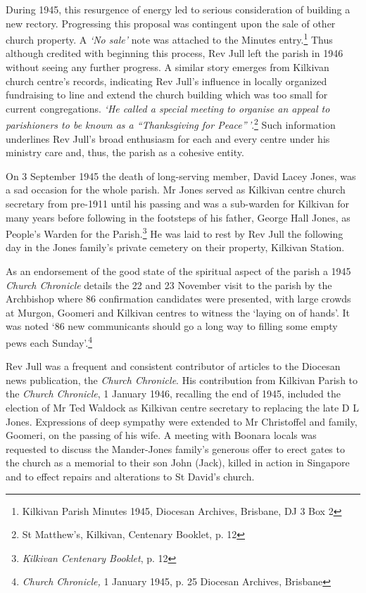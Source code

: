 During 1945, this resurgence of energy led to serious consideration of building a new rectory. Progressing this proposal was contingent upon the sale of other church property. A \emph{`No sale'} note was attached to the Minutes entry.\footnote{Kilkivan Parish Minutes 1945, Diocesan Archives, Brisbane, DJ 3 Box 2} Thus although credited with beginning this process, Rev Jull left the parish in 1946 without seeing any further progress. A similar story emerges from Kilkivan church centre's records, indicating Rev Jull's influence in locally organized fundraising to line and extend the church building which was too small for current congregations. \emph{`He called a special meeting to organise an appeal to parishioners to be known as a ``Thanksgiving for Peace''\,'}.\footnote{St Matthew's, Kilkivan, Centenary Booklet, p. 12} Such information underlines Rev Jull's broad enthusiasm for each and every centre under his ministry care and, thus, the parish as a cohesive entity.

On 3 September 1945 the death of long-serving member, David Lacey Jones, was a sad occasion for the whole parish. Mr Jones served as Kilkivan centre church secretary from pre-1911 until his passing and was a sub-warden for Kilkivan for many years before following in the footsteps of his father, George Hall Jones, as People's Warden for the Parish.\footnote{\emph{Kilkivan Centenary Booklet}, p. 12} He was laid to rest by Rev Jull the following day in the Jones family's private cemetery on their property, Kilkivan Station.

As an endorsement of the good state of the spiritual aspect of the parish a 1945 \emph{Church Chronicle} details the 22 and 23 November visit to the parish by the Archbishop where 86 confirmation candidates were presented, with large crowds at Murgon, Goomeri and Kilkivan centres to witness the `laying on of hands'. It was noted `86 new communicants should go a long way to filling some empty pews each Sunday'.\footnote{\emph{Church Chronicle,} 1 January 1945, p. 25 Diocesan Archives, Brisbane}

Rev Jull was a frequent and consistent contributor of articles to the Diocesan news publication, the \emph{Church Chronicle}. His contribution from Kilkivan Parish to the \emph{Church Chronicle}, 1 January 1946, recalling the end of 1945, included the election of Mr Ted Waldock as Kilkivan centre secretary to replacing the late D L Jones. Expressions of deep sympathy were extended to Mr Christoffel and family, Goomeri, on the passing of his wife. A meeting with Boonara locals was requested to discuss the Mander-Jones family's generous offer to erect gates to the church as a memorial to their son John (Jack), killed in action in Singapore and to effect repairs and alterations to St David's church.

